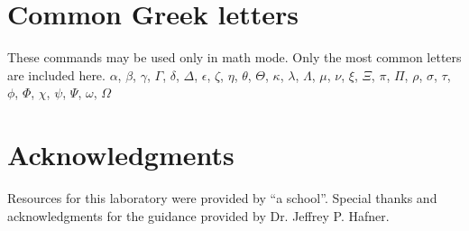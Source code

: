 \documentclass[
    10pt,aps,prl,
    amsfonts,
    amssymb,
    amsmath,
    draft,
    runinaddress,
    secnum,
    showkeys,
    superscriptaddress,
    twocolumn,
]{revtex4}
\begin{document}
\section{Common Greek letters}

These commands may be used only in math mode. 
Only the most common letters are included here.
$\alpha$, $\beta$, $\gamma$, $\Gamma$, $\delta$, $\Delta$, $\epsilon$, $\zeta$, $\eta$, $\theta$, $\Theta$, $\kappa$, $\lambda$, $\Lambda$, $\mu$, $\nu$, $\xi$, $\Xi$, $\pi$, $\Pi$, $\rho$, $\sigma$, $\tau$, $\phi$, $\Phi$, $\chi$, $\psi$, $\Psi$, $\omega$, $\Omega$



\section{Acknowledgments}
\label{sec:ack}
\begin{acknowledgments}
    Resources for this laboratory were provided by ``a school''.
    Special thanks and acknowledgments for the guidance provided by Dr. Jeffrey P. Hafner.
\end{acknowledgments}




\end{document}
